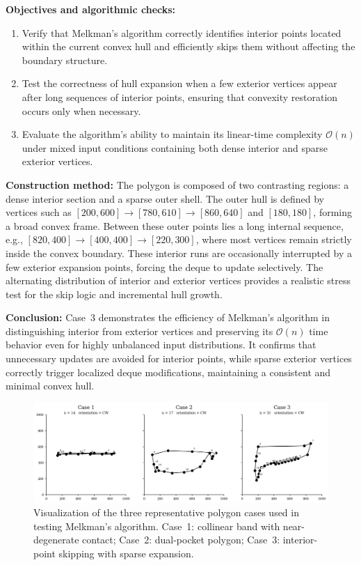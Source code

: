 \documentclass{article}
\begin{document}
\textbf{Objectives and algorithmic checks:}\

\begin{enumerate}
    \item Verify that Melkman’s algorithm correctly identifies interior points located within the current convex hull and efficiently skips them without affecting the boundary structure.
    \item Test the correctness of hull expansion when a few exterior vertices appear after long sequences of interior points, ensuring that convexity restoration occurs only when necessary.
    \item Evaluate the algorithm’s ability to maintain its linear-time complexity $\mathcal{O}(n)$ under mixed input conditions containing both dense interior and sparse exterior vertices.
\end{enumerate}

\textbf{Construction method:}
The polygon is composed of two contrasting regions: a dense interior section and a sparse outer shell. The outer hull is defined by vertices such as $[200,600] \rightarrow [780,610] \rightarrow [860,640]$ and $[180,180]$, forming a broad convex frame. Between these outer points lies a long internal sequence, e.g., $[820,400] \rightarrow [400,400] \rightarrow [220,300]$, where most vertices remain strictly inside the convex boundary. These interior runs are occasionally interrupted by a few exterior expansion points, forcing the deque to update selectively. The alternating distribution of interior and exterior vertices provides a realistic stress test for the skip logic and incremental hull growth.

\textbf{Conclusion:}
Case~3 demonstrates the efficiency of Melkman’s algorithm in distinguishing interior from exterior vertices and preserving its $\mathcal{O}(n)$ time behavior even for highly unbalanced input distributions. 
It confirms that unnecessary updates are avoided for interior points, while sparse exterior vertices correctly trigger localized deque modifications, maintaining a consistent and minimal convex hull.


\begin{figure}[H]
    \centering
    \includegraphics[width=0.9\linewidth]{Pictures/polygon_cases.png}
    \caption{Visualization of the three representative polygon cases used in testing Melkman’s algorithm. 
    Case~1: collinear band with near-degenerate contact; 
    Case~2: dual-pocket polygon; 
    Case~3: interior-point skipping with sparse expansion.}
\end{figure}
\end{document}
